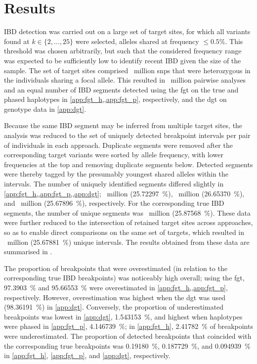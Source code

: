 %
\section{Results}
\label{sec:ibd_results}
%

IBD detection was carried out on a large set of target sites, for which all \fk{} variants found at ${k \in \lbrace 2, \ldots, 25 \rbrace}$ were selected, \ie alleles shared at frequency ${\leq 0.5\%}$.
This threshold was chosen arbitrarily, but such that the considered frequency range was expected to be sufficiently low to identify recent IBD given the size of the sample.
The set of target sites comprised ~million \glspl{snp} that were heterozygous in the individuals sharing a focal allele.
This resulted in ~million pairwise analyses and an equal number of IBD segments detected using the \gls{fgt} on the true and phased haplotypes in \cref{app:fgt_h,,app:fgt_p}, respectively, and the \gls{dgt} on genotype data in \cref{app:dgt}.

Because the same IBD segment may be inferred from multiple target sites, the analysis was reduced to the set of uniquely detected breakpoint intervals per pair of individuals in each approach.
Duplicate segments were removed after the corresponding target variants were sorted by allele frequency, with lower frequencies at the top and removing duplicate segments below.
Detected segments were thereby tagged by the presumably youngest shared alleles within the intervals.
The number of uniquely identified segments differed slightly in \cref{app:fgt_h,,app:fgt_p,,app:dgt};
~million (\SI{25.72297}{\percent}),
~million (\SI{26.65370}{\percent}), and
~million (\SI{25.67896}{\percent}), respectively.
For the corresponding true IBD segments, the number of unique segments was ~million (\SI{25.87568}{\percent}).
These data were further reduced to the intersection of retained target sites across approaches, so as to enable direct comparisons on the same set of targets, which resulted in ~million (\SI{25.67881}{\percent}) unique intervals.
The results obtained from these data are summarised in .

%

%

The proportion of breakpoints that were overestimated (in relation to the corresponding true IBD breakpoints) was noticeably high overall; using the \gls{fgt}, \SI{97.3903}{\percent} and \SI{95.66553}{\percent} were overestimated in \cref{app:fgt_h,,app:fgt_p}, respectively.
However, overestimation was highest when the \gls{dgt} was used (\SI{98.36191}{\percent}) in \cref{app:dgt}.
Conversely, the proportion of underestimated breakpoints was lowest in \ref{app:dgt}, \SI{1.543153}{\percent}, and highest when haplotypes were phased in \ref{app:fgt_p}, \SI{4.146739}{\percent}; in \ref{app:fgt_h}, \SI{2.41782}{\percent} of breakpoints were underestimated.
The proportion of detected breakpoints that coincided with the corresponding true breakpoints was \SI{0.19180}{\percent}, \SI{0.187729}{\percent}, and \SI{0.094939}{\percent} in \ref{app:fgt_h}, \ref{app:fgt_p}, and \ref{app:dgt}, respectively.

